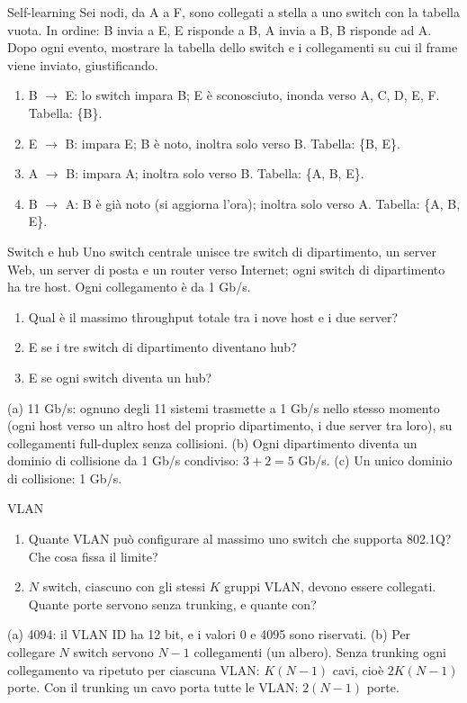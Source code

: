 \begin{esercizio}{Self-learning}
Sei nodi, da A a F, sono collegati a stella a uno switch con la tabella vuota. In ordine: B invia a E, E risponde a B, A invia a B, B
risponde ad A. Dopo ogni evento, mostrare la tabella dello switch e i collegamenti su cui il frame viene inviato, giustificando.

\svolgimento
\begin{enumerate}
    \item B $\rightarrow$ E: lo switch impara B; E è sconosciuto, inonda verso A, C, D, E, F. Tabella: \{B\}.
    \item E $\rightarrow$ B: impara E; B è noto, inoltra solo verso B. Tabella: \{B, E\}.
    \item A $\rightarrow$ B: impara A; inoltra solo verso B. Tabella: \{A, B, E\}.
    \item B $\rightarrow$ A: B è già noto (si aggiorna l'ora); inoltra solo verso A. Tabella: \{A, B, E\}.
\end{enumerate}
\end{esercizio}

\begin{esercizio}{Switch e hub}
Uno switch centrale unisce tre switch di dipartimento, un server Web, un server di posta e un router verso Internet; ogni switch di
dipartimento ha tre host. Ogni collegamento è da 1 Gb/s.
\begin{enumerate}[label=(\alph*)]
    \item Qual è il massimo throughput totale tra i nove host e i due server?
    \item E se i tre switch di dipartimento diventano hub?
    \item E se ogni switch diventa un hub?
\end{enumerate}

\svolgimento
(a) 11 Gb/s: ognuno degli 11 sistemi trasmette a 1 Gb/s nello stesso momento (ogni host verso un altro host del proprio dipartimento, i due
server tra loro), su collegamenti full-duplex senza collisioni. (b) Ogni dipartimento diventa un dominio di collisione da 1 Gb/s
condiviso: $3 + 2 = 5$ Gb/s. (c) Un unico dominio di collisione: 1 Gb/s.
\end{esercizio}

\begin{esercizio}{VLAN}
\begin{enumerate}[label=(\alph*)]
    \item Quante VLAN può configurare al massimo uno switch che supporta 802.1Q? Che cosa fissa il limite?
    \item $N$ switch, ciascuno con gli stessi $K$ gruppi VLAN, devono essere collegati. Quante porte servono senza trunking, e quante con?
\end{enumerate}

\svolgimento
(a) 4094: il VLAN ID ha 12 bit, e i valori 0 e 4095 sono riservati. (b) Per collegare $N$ switch servono $N - 1$ collegamenti (un albero).
Senza trunking ogni collegamento va ripetuto per ciascuna VLAN: $K(N-1)$ cavi, cioè $2K(N-1)$ porte. Con il trunking un cavo porta tutte le
VLAN: $2(N-1)$ porte.
\end{esercizio}

